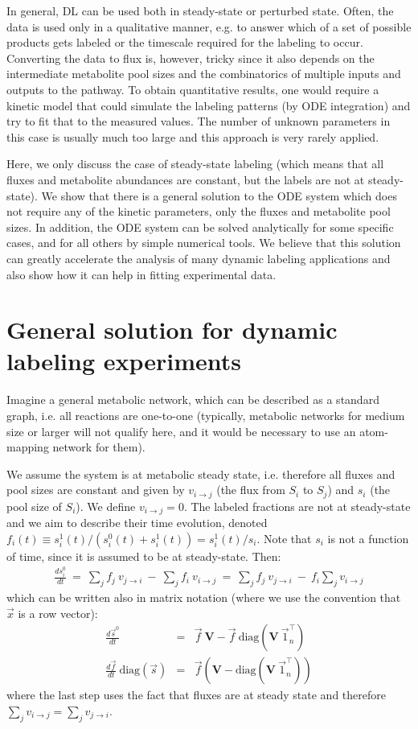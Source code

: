 \documentclass{article}
\newcommand{\flux}[2]{\ensuremath{v_{{#1} \rightarrow {#2}}}}
\begin{document}
In general, DL can be used both in steady-state or perturbed state. Often, the data is used only in a qualitative manner, e.g. to answer which of a set of possible products gets labeled or the timescale required for the labeling to occur. Converting the data to flux is, however, tricky since it also depends on the intermediate metabolite pool sizes and the combinatorics of multiple inputs and outputs to the pathway. To obtain quantitative results, one would require a kinetic model that could simulate the labeling patterns (by ODE integration) and try to fit that to the measured values. The number of unknown parameters in this case is usually much too large and this approach is very rarely applied.

Here, we only discuss the case of steady-state labeling (which means that all fluxes and metabolite abundances are constant, but the labels are not at steady-state). We show that there is a general solution to the ODE system which does not require any of the kinetic parameters, only the fluxes and metabolite pool sizes. In addition, the ODE system can be solved analytically for some specific cases, and for all others by simple numerical tools. We believe that this solution can greatly accelerate the analysis of many dynamic labeling applications and also show how it can help in fitting experimental data.


\section{General solution for dynamic labeling experiments}
Imagine a general metabolic network, which can be described as a standard graph, i.e. all reactions are one-to-one (typically, metabolic networks for medium size or larger will not qualify here, and it would be necessary to use an atom-mapping network for them).

We assume the system is at metabolic steady state, i.e. therefore all fluxes and pool sizes are constant and given by \flux{i}{j} (the flux from $S_i$ to $S_j$) and $s_i$ (the pool size of $S_i$). We define $\flux{i}{j} = 0$. The labeled fractions are not at steady-state and we aim to describe their time evolution, denoted $f_i(t) \equiv s_i^1(t) / (s_i^0(t) + s_i^1(t)) = s_i^1(t) / s_i$. Note that $s_i$ is not a function of time, since it is assumed to be at steady-state. Then:
\begin{eqnarray}
    \frac{d s_i^0}{dt} ~=~
    \sum_j f_j~\flux{j}{i} ~-~ \sum_j f_i~\flux{i}{j} ~=~ 
    \sum_j f_j~\flux{j}{i} ~-~ f_i \sum_j \flux{i}{j}
\end{eqnarray}
which can be written also in matrix notation (where we use the convention that $\vec{x}$ is a row vector):
\begin{eqnarray}
	\frac{d\vec{s}^0}{dt} 
	&=& \vec{f}~\mathbf{V} - \vec{f}~\text{diag}(\mathbf{V}~\vec{1}_n^\top) \\
	\frac{d\vec{f}}{dt}~\text{diag}(\vec{s})
	&=& \vec{f} \left( \mathbf{V} - \text{diag}(\mathbf{V}~\vec{1}_n^\top) \right)
\end{eqnarray}
where the last step uses the fact that fluxes are at steady state and therefore $\sum_j v_{i \rightarrow j} = \sum_j v_{j \rightarrow i}$.
\end{document}
